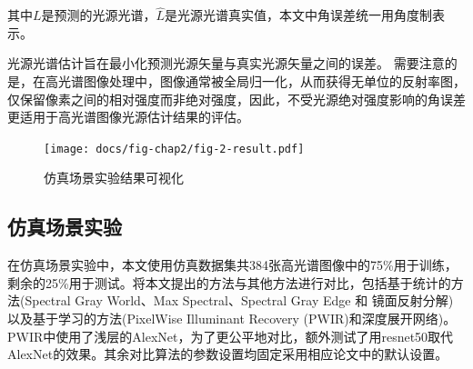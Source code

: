 \documentclass[
    type = master, %
    degree = academic,        %
    decl-page,  %
  ]{njuthesis}
\begin{document}
其中$L$是预测的光源光谱，$\hat{L}$是光源光谱真实值，本文中角误差统一用角度制表示。

光源光谱估计旨在最小化预测光源矢量与真实光源矢量之间的误差。 需要注意的是，在高光谱图像处理中，图像通常被全局归一化，从而获得无单位的反射率图，仅保留像素之间的相对强度而非绝对强度，因此，不受光源绝对强度影响的角误差更适用于高光谱图像光源估计结果的评估。


\begin{figure}
	\centering
	\texttt{[image: docs/fig-chap2/fig-2-result.pdf]}
	\caption{仿真场景实验结果可视化}
	\label{fig:simulated result}
\end{figure}

\subsection{仿真场景实验 }

在仿真场景实验中，本文使用仿真数据集共384张高光谱图像中的75\%用于训练，剩余的25\%用于测试。将本文提出的方法与其他方法进行对比，包括基于统计的方法(Spectral Gray World、Max Spectral、Spectral Gray Edge\cite{RN17} 和 镜面反射分解\cite{RN35})以及基于学习的方法(PixelWise Illuminant Recovery (PWIR)\cite {RN24}和深度展开网络\cite{li2021multispectral})。PWIR中使用了浅层的AlexNet，为了更公平地对比，额外测试了用resnet50取代AlexNet的效果。其余对比算法的参数设置均固定采用相应论文中的默认设置。
\end{document}
